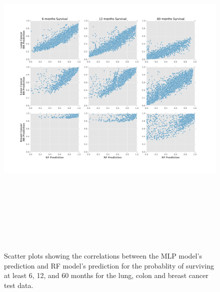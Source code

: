 \documentclass[10pt,letterpaper]{article}
\begin{document}
\begin{figure}[tbp]
\begin{adjustwidth}{-2.25in}{0in} %
\includegraphics[height=17cm,origin=l]{totalscatter.pdf}
\caption{\label{fig:totalscatter} Scatter plots showing the correlations between the MLP model's prediction and RF model's prediction for the probablity of surviving at least 6, 12, and 60 months for the lung, colon and breast cancer test data.}
\end{adjustwidth}
\end{figure}
\end{document}

